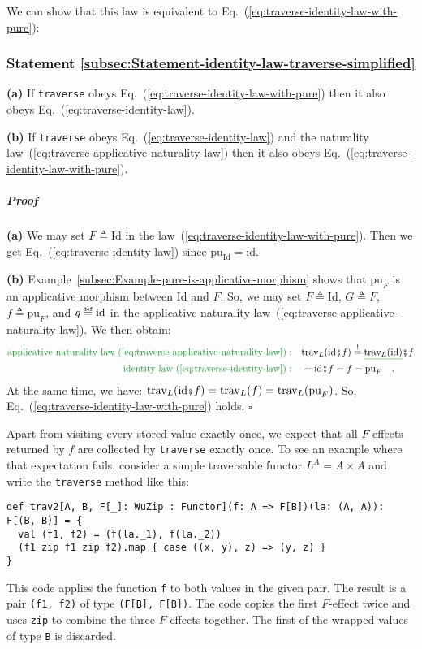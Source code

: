 We can show that this law is equivalent to Eq.~(\ref{eq:traverse-identity-law-with-pure}):

\subsubsection{Statement \label{subsec:Statement-identity-law-traverse-simplified}\ref{subsec:Statement-identity-law-traverse-simplified}}

\textbf{(a)} If \lstinline!traverse! obeys Eq.~(\ref{eq:traverse-identity-law-with-pure})
then it also obeys Eq.~(\ref{eq:traverse-identity-law}).

\textbf{(b)} If \lstinline!traverse! obeys Eq.~(\ref{eq:traverse-identity-law})
and the naturality law~(\ref{eq:traverse-applicative-naturality-law})
then it also obeys Eq.~(\ref{eq:traverse-identity-law-with-pure}).

\subparagraph{Proof}

\textbf{(a)} We may set $F\triangleq\text{Id}$ in the law~(\ref{eq:traverse-identity-law-with-pure}).
Then we get Eq.~(\ref{eq:traverse-identity-law}) since $\text{pu}_{\text{Id}}=\text{id}$.

\textbf{(b)} Example~\ref{subsec:Example-pure-is-applicative-morphism}
shows that $\text{pu}_{F}$ is an applicative morphism between $\text{Id}$
and $F$. So, we may set $F\triangleq\text{Id}$, $G\triangleq F$,
$f\triangleq\text{pu}_{F}$, and $g\triangleq\text{\text{id}}$ in
the applicative naturality law~(\ref{eq:traverse-applicative-naturality-law}).
We then obtain:
\begin{align*}
{\color{greenunder}\text{applicative naturality law~(\ref{eq:traverse-applicative-naturality-law})}:}\quad & \text{trav}_{L}(\text{id}\bef f)\overset{!}{=}\gunderline{\text{trav}_{L}(\text{id})}\bef f\\
{\color{greenunder}\text{identity law~(\ref{eq:traverse-identity-law})}:}\quad & =\text{id}\bef f=f=\text{pu}_{F}\quad.
\end{align*}
At the same time, we have: $\text{trav}_{L}(\text{id}\bef f)=\text{trav}_{L}(f)=\text{trav}_{L}(\text{pu}_{F})$.
So, Eq.~(\ref{eq:traverse-identity-law-with-pure}) holds. $\square$

Apart from visiting every stored value exactly once, we expect that
all $F$-effects returned by $f$ are collected by \lstinline!traverse!
exactly once. To see an example where that expectation fails, consider
a simple traversable functor $L^{A}=A\times A$ and write the \lstinline!traverse!
method like this:
\begin{lstlisting}
def trav2[A, B, F[_]: WuZip : Functor](f: A => F[B])(la: (A, A)): F[(B, B)] = {
  val (f1, f2) = (f(la._1), f(la._2))
  (f1 zip f1 zip f2).map { case ((x, y), z) => (y, z) }
}
\end{lstlisting}
This code applies the function \lstinline!f! to both values in the
given pair. The result is a pair \lstinline!(f1, f2)! of type \lstinline!(F[B], F[B])!.
The code copies the first $F$-effect twice and uses \lstinline!zip!
to combine the three $F$-effects together. The first of the wrapped
values of type \lstinline!B! is discarded.

